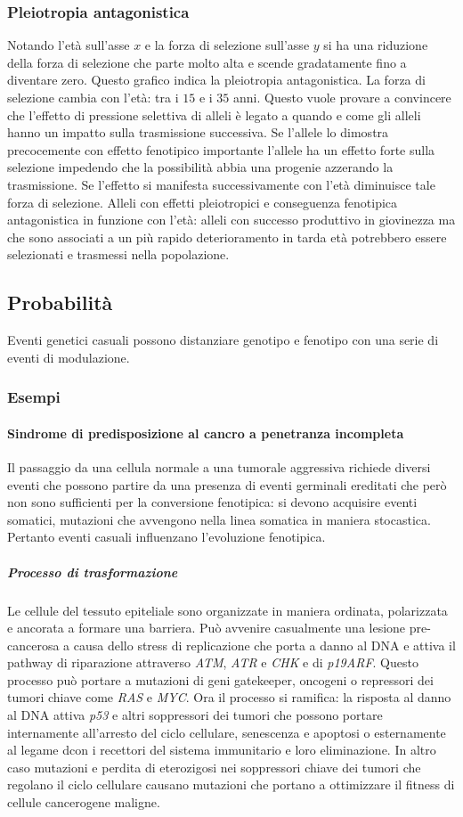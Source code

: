 \subsubsection{Pleiotropia antagonistica}
Notando l'et\`a sull'asse $x$ e la forza di selezione sull'asse $y$ si ha una riduzione della forza di selezione che parte molto alta e scende gradatamente fino a diventare zero. 
Questo grafico indica la pleiotropia antagonistica. La forza di selezione cambia con l'et\`a: tra i $15$ e i $35$ anni. Questo vuole provare a convincere che l'effetto di pressione 
selettiva di alleli \`e legato a quando e come gli alleli hanno un impatto sulla trasmissione successiva. Se l'allele lo dimostra precocemente con effetto fenotipico importante 
l'allele ha un effetto forte sulla selezione impedendo che la possibilit\`a abbia una progenie azzerando la trasmissione. Se l'effetto si manifesta successivamente con l'et\`a diminuisce
tale forza di selezione. Alleli con effetti pleiotropici e conseguenza fenotipica antagonistica in funzione con l'et\`a: alleli con successo produttivo in giovinezza ma che 
sono associati a un pi\`u rapido deterioramento in tarda et\`a potrebbero essere selezionati e trasmessi nella popolazione. 
\subsection{Probabilit\`a}
Eventi genetici casuali possono distanziare genotipo e fenotipo con una serie di eventi di modulazione.
\subsubsection{Esempi}
\paragraph{Sindrome di predisposizione al cancro a penetranza incompleta}
Il passaggio da una cellula normale a una tumorale aggressiva richiede diversi eventi che possono partire da una presenza di eventi germinali ereditati che per\`o non sono sufficienti per la conversione
fenotipica: si devono acquisire eventi somatici, mutazioni che avvengono nella linea somatica in maniera stocastica. Pertanto eventi casuali influenzano l'evoluzione fenotipica.
\subparagraph{Processo di trasformazione}
Le cellule del tessuto epiteliale sono organizzate in maniera ordinata, polarizzata e ancorata a formare una barriera. Pu\`o avvenire casualmente una lesione pre-cancerosa a causa dello stress di 
replicazione che porta a danno al DNA e attiva il pathway di riparazione attraverso \emph{ATM}, \emph{ATR} e \emph{CHK} e di \emph{p19ARF}. Questo processo pu\`o portare a mutazioni di geni gatekeeper,
oncogeni o repressori dei tumori chiave come \emph{RAS} e \emph{MYC}. Ora il processo si ramifica: la risposta al danno al DNA attiva \emph{p53} e altri soppressori dei tumori che possono portare 
internamente all'arresto del ciclo cellulare, senescenza e apoptosi o esternamente al legame dcon i recettori del sistema immunitario e loro eliminazione. In altro caso mutazioni e perdita di eterozigosi
nei soppressori chiave dei tumori che regolano il ciclo cellulare causano mutazioni che portano a ottimizzare il fitness di cellule cancerogene maligne. 

